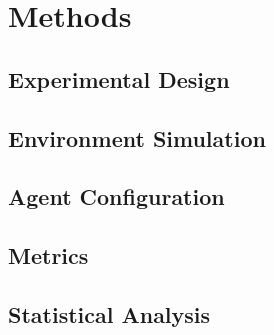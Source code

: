 \section{Methods}
\label{sec:methods}

\subsection{Experimental Design}


\subsection{Environment Simulation}


\subsection{Agent Configuration}


\subsection{Metrics}


\subsection{Statistical Analysis}

